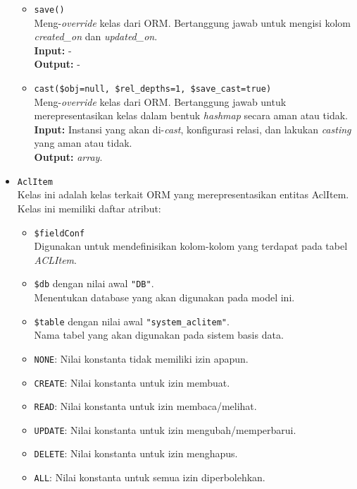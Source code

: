 \begin{itemize}
\begin{itemize}
                \item \texttt{save()}\\
                    Meng-\textit{override} kelas dari ORM. Bertanggung jawab
                    untuk mengisi kolom \textit{created\_on} dan
                    \textit{updated\_on}.\\
                    \textbf{Input:} -\\
                    \textbf{Output:} -
                
                \item \texttt{cast(\$obj=null, \$rel\_depths=1,
                \$save\_cast=true)}\\
                    Meng-\textit{override} kelas dari ORM. Bertanggung jawab
                    untuk merepresentasikan kelas dalam bentuk \textit{hashmap}
                    secara aman atau tidak. \\
                    \textbf{Input:} Instansi yang akan di-\textit{cast},
                        konfigurasi relasi, dan lakukan \textit{casting} yang
                        aman atau tidak.\\
                    \textbf{Output:} \textit{array}.
            \end{itemize}
            
        \item \texttt{AclItem} \\
            Kelas ini adalah kelas terkait ORM yang merepresentasikan entitas
            AclItem. Kelas ini memiliki daftar atribut:
            \begin{itemize}
                \item \texttt{\$fieldConf} \\
                    Digunakan untuk mendefinisikan kolom-kolom yang terdapat
                    pada tabel \textit{ACLItem}.
                \item \texttt{\$db} dengan nilai awal \texttt{"DB"}. \\
                    Menentukan database yang akan digunakan pada model ini.
                \item \texttt{\$table} dengan nilai awal
                \texttt{"system\_aclitem"}. \\
                    Nama tabel yang akan digunakan pada sistem basis data. 
                \item \texttt{NONE}: Nilai konstanta tidak memiliki izin apapun.
                \item \texttt{CREATE}: Nilai konstanta untuk izin membuat.
                \item \texttt{READ}: Nilai konstanta untuk izin membaca/melihat.
                \item \texttt{UPDATE}: Nilai konstanta untuk izin
                mengubah/memperbarui.
                \item \texttt{DELETE}: Nilai konstanta untuk izin menghapus.
                \item \texttt{ALL}: Nilai konstanta untuk semua izin
                diperbolehkan.
            \end{itemize}
            

\end{itemize}
